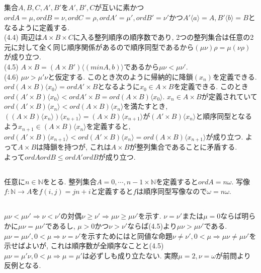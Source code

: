 \documentclass{jsarticle}
\begin{document}
\subsection{} %
集合$A, B, C, A', B'$を$A', B', C$が互いに素かつ$ord A = \mu, ord B = \nu, ord C = \rho, ord A' = \mu', ord B' = \nu'$かつ$A'\langle a \rangle = A, B'\langle b \rangle = B$となるように定義する.\\
(4.4) 両辺は$A \times B \times C$に入る整列順序の順序数であり, 2つの整列集合は任意の2元に対して全く同じ順序関係があるので順序同型であるから$(\mu\nu)\rho=\mu(\nu\rho)$が成り立つ.\\
(4.5) $A \times B = (A \times B')\langle (min A, b) \rangle$であるから$\mu\nu < \mu\nu'$.\\
(4.6) $\mu\nu > \mu'\nu$と仮定する. このとき次のように帰納的に降鎖$(x_n)$を定義できる. $ord (A \times B)\langle x_0\rangle = ord A' \times B$となるように$x_0 \in A \times B$を定義できる. このとき$ord (A' \times B)\langle x_0 \rangle < ord A' \times B = ord (A \times B)\langle x_0 \rangle$. $x_n \in A \times B$が定義されていて$ord (A' \times B)\langle x_n \rangle < ord (A \times B)\langle x_n \rangle$を満たすとき, $((A \times B)\langle x_{n} \rangle)\langle x_{n + 1} \rangle = (A \times B)\langle x_{n + 1}\rangle$が$(A' \times B)\langle x_n \rangle$と順序同型となるよう$x_{n + 1} \in (A \times B)\langle x_n \rangle$を定義すると, $ord (A' \times B)\langle x_{n + 1} \rangle < ord (A'\times B)\langle x_{n} \rangle = ord (A \times B)\langle x_{n + 1}\rangle$が成り立つ. よって$A \times B$は降鎖を持つが, これは$A \times B$が整列集合であることに矛盾する.\\
よって$ord A ord B \le ord A' ord B$が成り立つ.

\subsection{} %
任意に$n \in \mathbb{N}$をとる. 整列集合$A = {0, \cdots, n - 1} \times \mathbb{N}$を定義すると$ord A = n\omega$. 写像$f:\mathbb{N} \rightarrow A$を$f(i, j) = jn + i$と定義すると$f$は順序同型写像なので$\omega = n\omega$.

\subsection{} %
$\mu\nu < \mu\nu' \Rightarrow \nu < \nu'$の対偶$\nu \ge \nu' \Rightarrow \mu\nu \ge \mu\nu'$を示す. $\nu = \nu'$または$\mu = 0$ならば明らかに$\mu\nu = \mu\nu'$であるし, $\mu > 0$かつ$\nu > \nu'$ならば(4.5)より$\mu\nu > \mu\nu'$である.\\
$\mu\nu = \mu\nu', 0 < \mu \Rightarrow \nu = \nu'$を示すためにはと同値な命題$\nu \neq \nu', 0 < \mu \Rightarrow \mu\nu \neq \mu\nu'$を示せばよいが, これは順序数が全順序なことと(4.5)\\
$\mu\nu = \mu'\nu, 0 < \mu \Rightarrow \mu = \mu'$は必ずしも成り立たない. 実際$\mu = 2, \nu = \omega$が前問より反例となる.
\end{document}
